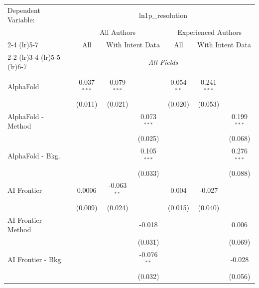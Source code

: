 \begingroup
\centering
\begin{tabular}{lcccccc}
   \tabularnewline \midrule \midrule
   Dependent Variable: & \multicolumn{6}{c}{ln1p\_resolution}\\
 & \multicolumn{3}{c}{All Authors} & \multicolumn{3}{c}{Experienced Authors} \\
\cmidrule(lr){2-4} \cmidrule(lr){5-7}
 & \multicolumn{1}{c}{All} & \multicolumn{2}{c}{With Intent Data} & \multicolumn{1}{c}{All} & \multicolumn{2}{c}{With Intent Data} \\
\cmidrule(lr){2-2} \cmidrule(lr){3-4} \cmidrule(lr){5-5} \cmidrule(lr){6-7}
 & \multicolumn{6}{c}{\textit{All Fields}} \\ \\
   AlphaFold            & 0.037$^{***}$ & 0.079$^{***}$ &               & 0.054$^{**}$ & 0.241$^{***}$ &   \\   
                        & (0.011)       & (0.021)       &               & (0.020)      & (0.053)       &   \\   
   AlphaFold - Method   &               &               & 0.073$^{***}$ &              &               & 0.199$^{***}$\\   
                        &               &               & (0.025)       &              &               & (0.068)\\   
   AlphaFold - Bkg.     &               &               & 0.105$^{***}$ &              &               & 0.276$^{***}$\\   
                        &               &               & (0.033)       &              &               & (0.088)\\   
   AI Frontier          & 0.0006        & -0.063$^{**}$ &               & 0.004        & -0.027        &   \\   
                        & (0.009)       & (0.024)       &               & (0.015)      & (0.040)       &   \\   
   AI Frontier - Method &               &               & -0.018        &              &               & 0.006\\   
                        &               &               & (0.031)       &              &               & (0.069)\\   
   AI Frontier - Bkg.   &               &               & -0.076$^{**}$ &              &               & -0.028\\   
                        &               &               & (0.032)       &              &               & (0.056)\\   

\end{tabular}
